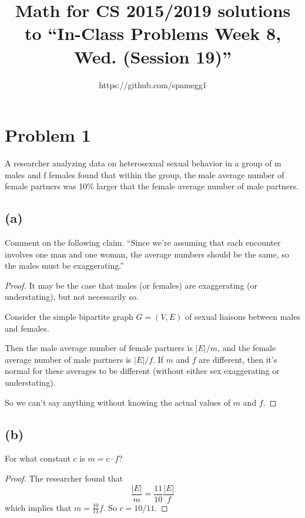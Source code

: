 \documentclass[14pt]{extarticle}
\title{Math for CS 2015/2019 solutions to ``In-Class Problems Week 8, Wed. (Session 19)''}
\author{https://github.com/spamegg1}
\begin{document}
\maketitle
\tableofcontents

\section{Problem 1}
A researcher analyzing data on heterosexual sexual behavior in a group of m males and f females found that within the group, the male average number of female partners was 10\% larger that the female average number of male partners.

\subsection{(a)}
Comment on the following claim. “Since we’re assuming that each encounter involves one man and one woman, the average numbers should be the same, so the males must be exaggerating.”
\begin{proof}
It may be the case that males (or females) are exaggerating (or understating), but not necessarily so.

Consider the simple bipartite graph $G = (V, E)$ of sexual liaisons between males and females. 

Then the male average number of female partners is $|E| / m$, and the female average number of male partners is $|E| / f$. If $m$ and $f$ are different, then it's normal for these averages to be different (without either sex exaggerating or understating).

So we can't say anything without knowing the actual values of $m$ and $f$.
\end{proof}

\subsection{(b)}
For what constant $c$ is $m = c \cdot f$?
\begin{proof}
The researcher found that 
$$
\frac{|E|}{m} = \frac{11}{10} \frac{|E|}{f}
$$ 
which implies that $m = \frac{10}{11}f$. So $c = 10/11$.
\end{proof}
\end{document}
